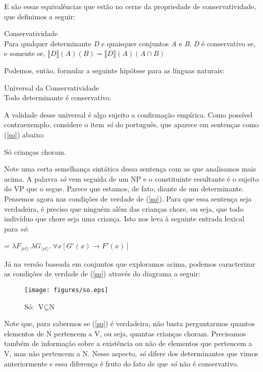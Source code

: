 \n E são essas equivalências que estão no cerne da propriedade de
conservatividade, que definimos a seguir:

\begin{exe}
	\ex Conservatividade\\
	Para qualquer determinante \textit{D} e quaisquer conjuntos \textit{A} e \textit{B}, \textit{D} é conservativo se, e somente se, $\llbracket D \rrbracket(A)(B)= \llbracket D \rrbracket(A)(A\cap B)$
\end{exe}


\n Podemos, então, formular a seguinte hipótese para as línguas naturais:

\begin{exe}
	\ex Universal da Conservatividade\\
	Todo determinante é conservativo.
\end{exe}


\n A validade desse universal é algo sujeito a confirmação
empírica. Como possível contraexemplo, considere o item
\textit{só} do português, que aparece em sentenças como (\ref{so})
abaixo:

\begin{exe}
    \ex Só crianças choram. \label{so}
\end{exe}

\n Note uma certa semelhança sintática dessa sentença com as que
analisamos mais acima. A palavra \textit{só} vem seguida de um NP
e o constituinte resultante é o sujeito do VP que o segue. Parece
que estamos, de fato, diante de um determinante. Pensemos agora
nas condições de verdade de (\ref{so}). Para que essa sentença
seja verdadeira, é preciso que ninguém além das crianças chore, ou seja, que todo indivíduo que chore seja uma
criança. Isto nos leva à seguinte entrada lexical para
\textit{só}:

\begin{exe}
	\ex {} = $\lambda F_{\langle et\rangle}.\lambda G_{\langle et\rangle}.\ \forall x [G'(x)\rightarrow F'(x)]$
\end{exe}

\n Já na versão baseada em conjuntos que exploramos acima, podemos
caracterizar as condições de verdade de (\ref{so}) através do
diagrama a seguir:

\begin{figure}[H]
\centerline{\texttt{[image: figures/so.eps]}} \caption{Só:
$\text{V}\subseteq\text{N}$}
\end{figure}

\n Note que, para sabermos se (\ref{so}) é verdadeira, não basta
perguntarmos quantos elementos de N pertencem a V, ou seja, quantas crianças choram. Precisamos
também de informação sobre a existência ou não de elementos que
pertencem a V, mas não pertencem a N. Nesse aspecto, \textit{só}
difere dos determinantes que vimos anteriormente e essa diferença
é fruto do fato de que \textit{só} não é conservativo. 

